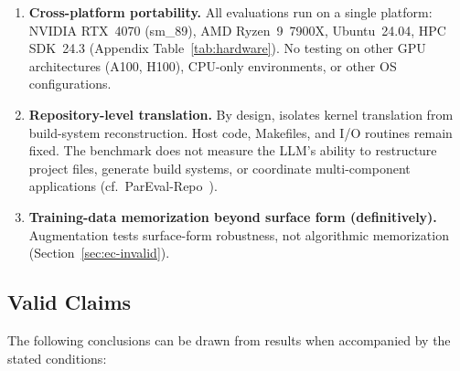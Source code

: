 \begin{enumerate}
  \item \textbf{Cross-platform portability.} All evaluations run on a single
    platform: NVIDIA RTX~4070 (sm\_89), AMD Ryzen~9~7900X, Ubuntu~24.04, HPC
    SDK~24.3 (Appendix Table~\ref{tab:hardware}). No testing on other GPU
    architectures (A100, H100), CPU-only environments, or other OS
    configurations.

  \item \textbf{Repository-level translation.} By design, \parbench{} isolates
    kernel translation from build-system reconstruction. Host code, Makefiles,
    and I/O routines remain fixed. The benchmark does not measure the LLM's
    ability to restructure project files, generate build systems, or coordinate
    multi-component applications (cf.\
    ParEval-Repo~\cite{ParEvalRepo2025}).

  \item \textbf{Training-data memorization beyond surface form (definitively).} Augmentation tests
    surface-form robustness, not algorithmic memorization
    (Section~\ref{sec:ec-invalid}).
\end{enumerate}

\subsection{Valid Claims}
\label{sec:ec-valid}

The following conclusions can be drawn from \parbench{} results when
accompanied by the stated conditions:

